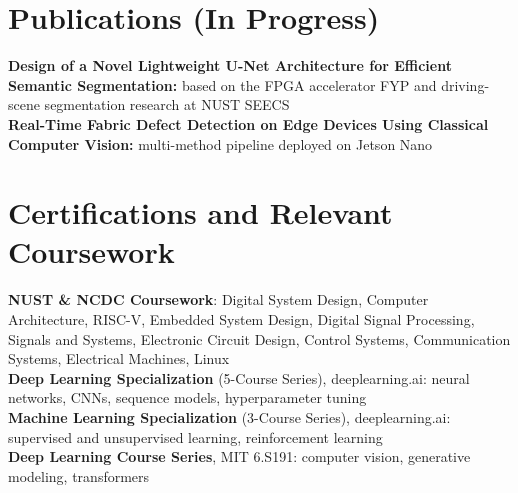 \documentclass[letterpaper,11pt]{article}
\begin{document}
\section{Publications (In Progress)}
 \begin{itemize}[leftmargin=0.15in, label={}]
    \small{\item{
     \textbf{Design of a Novel Lightweight U-Net Architecture for Efficient Semantic Segmentation:} based on the FPGA accelerator FYP and driving-scene segmentation research at NUST SEECS \\
     \textbf{Real-Time Fabric Defect Detection on Edge Devices Using Classical Computer Vision:} multi-method pipeline deployed on Jetson Nano
    }}
 \end{itemize}

\section{Certifications and Relevant Coursework}
 \begin{itemize}[leftmargin=0.15in, label={}]
    \small{\item{
     \textbf{NUST \& NCDC Coursework}: Digital System Design, Computer Architecture, RISC-V, Embedded System Design, Digital Signal Processing, Signals and Systems, Electronic Circuit Design, Control Systems, Communication Systems, Electrical Machines, Linux \\
     \textbf{Deep Learning Specialization} (5-Course Series), deeplearning.ai: neural networks, CNNs, sequence models, hyperparameter tuning \\
     \textbf{Machine Learning Specialization} (3-Course Series), deeplearning.ai: supervised and unsupervised learning, reinforcement learning \\
     \textbf{Deep Learning Course Series}, MIT 6.S191: computer vision, generative modeling, transformers
    }}
 \end{itemize}

\end{document}
